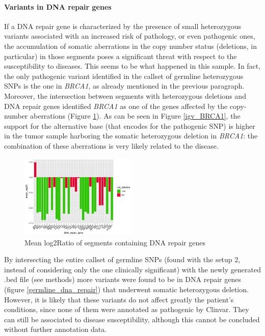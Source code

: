 \documentclass[11pt]{article}
\begin{document}
\paragraph{Variants in DNA repair genes}

If a DNA repair gene is characterized by the presence of small heterozygous variants associated with an increased risk of pathology, or even pathogenic ones, the accumulation of somatic aberrations in the copy number status (deletions, in particular) in those segments poses a significant threat with respect to the susceptibility to diseases. This seems to be what happened in this sample.
In fact, the only pathogenic variant identified in the callset of germline heterozygous SNPs is the one in \emph{BRCA1}, as already mentioned in the previous paragraph. Moreover, the intersection between segments with heterozygous deletions and DNA repair genes identified \emph{BRCA1} as one of the genes affected by the copy-number aberrations (Figure \ref{SCNA_DNARepair}). As can be seen in Figure \ref{igv_BRCA1}, the support for the alternative base (that encodes for the pathogenic SNP) is higher in the tumor sample harboring the somatic heterozygous deletion in \emph{BRCA1}: the combination of these aberrations is very likely related to the disease.

\begin{figure}[H]
   \centering
   \includegraphics[width=0.5\textwidth]{images/SCNA_DNARepairGenes.png}
   \caption{\footnotesize{Mean log2Ratio of segments containing DNA repair genes}}
   \label{SCNA_DNARepair}
\end{figure}

By intersecting the entire callset of germline SNPs (found with the setup 2, instead of considering only the one clinically significant) with the newly generated .bed file (see methods) more variants were found to be in DNA repair genes (figure \ref{germline_dna_repair}) that underwent somatic heterozygous deletion. However, it is likely that these variants do not affect greatly the patient's conditions, since none of them were annotated as pathogenic by Clinvar. They can still be associated to disease susceptibility, although this cannot be concluded without further annotation data.
\end{document}
